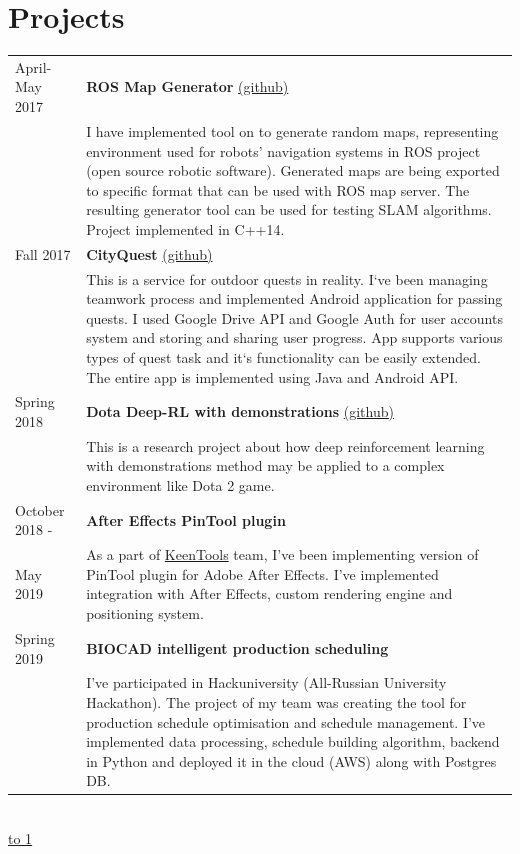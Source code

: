 \documentclass[10pt]{article}
\def\LINE{\vspace*{-1em}\noindent \underline{\hbox to 1\textwidth{{ } \hfil{ } \hfil{ } }}}
\begin{document}
\section*{\color{accent} Projects}
\begin{tabular}{p{2.5cm}|p{14.7cm}}
  April-May 2017 \  & \textbf{ROS Map Generator} \href{https://github.com/karvozavr/ROS-Map-Generator}{\scriptsize (github)} \\
  & \footnotesize{I have implemented tool on to generate random maps, representing environment used for robots' navigation systems in ROS project (open source robotic software). Generated maps are being exported to specific format that can be used with ROS map server. The resulting generator tool can be used for testing SLAM algorithms. Project implemented in \textsc{C++14}.}  \\
  Fall 2017  & \textbf{CityQuest} \href{https://github.com/karvozavr/CityQuest/tree/dev}{\scriptsize (github)} \\
  & \footnotesize{This is a service for outdoor quests in reality. I`ve been managing teamwork process and implemented Android application for passing quests. I used Google Drive API and Google Auth for user accounts system and storing and sharing user progress. 
    App supports various types of quest task and it`s functionality can be easily extended. The entire app is implemented using Java and Android API.}   \\
  Spring 2018 & \textbf{Dota Deep-RL with demonstrations} \href{https://github.com/karvozavr/DotA-DeepRL}{\scriptsize (github)} \\
  & \footnotesize{This is a research project about how deep reinforcement learning with demonstrations method may be applied to a complex environment like Dota 2 game.}   \\
    October 2018 - & \textbf{After Effects PinTool plugin} \\
  May 2019 & \footnotesize{As a part of \href{https://www.keentools.io/}{KeenTools} team, I've been implementing version of PinTool plugin for Adobe After Effects. I've implemented integration with After Effects, custom rendering engine and positioning system.} \\
  Spring 2019 & \textbf{BIOCAD intelligent production scheduling} \\
  & \footnotesize{I've participated in Hackuniversity (All-Russian University Hackathon). The project of my team was creating the tool for production schedule optimisation and schedule management. I've implemented data processing, schedule building algorithm, backend in Python and deployed it in the cloud (AWS) along with Postgres DB.}  
\end{tabular}
\\
\LINE
\end{document}
